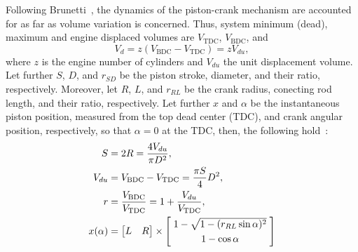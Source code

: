    Following Brunetti~\cite{2012-BrunettiF-Blucher}, the dynamics of the piston-crank mechanism are accounted  for  as  far  as
    volume variation is concerned. Thus, system minimum (dead), maximum and engine displaced volumes are  $V_{\mathrm{TDC}}$,  $V_{\mathrm{BDC}}$,
    and%
    \begin{equation}
        V_d = z(V_{\mathrm{BDC}} - V_{\mathrm{TDC}}) = zV_{du},
        \label{eq:Vd}
    \end{equation}
    \noindent where $z$ is the engine number of cylinders and $V_{du}$ the unit displacement volume. Let further $S$,  $D$,  and
    $r_{SD}$ be the piston stroke, diameter, and their ratio, respectively. Moreover, let $R$, $L$, and $r_{RL}$  be  the  crank
    radius, conecting rod length, and their ratio, respectively. Let further  $x$  and  $\alpha$  be  the  instantaneous  piston
    position, measured from the top dead center (TDC), and crank angular position, respectively, so that $\alpha  =  0$  at  the
    TDC, then, the following hold~\cite{2012-BrunettiF-Blucher, 2017-NaaktgeborenC-IntJMechEngEduc}:%
    \begin{align}
        \label{eq:S}
        S           &= 2R = \frac{4 V_{du}}{\pi D^{2}}, \\
        \label{eq:Vdu}
        V_{du}      &= V_{\mathrm{BDC}} - V_{\mathrm{TDC}} = \frac{\pi S}{4} D^{2}, \\
        \label{eq:r}
        r           &= \frac{V_{\mathrm{BDC}}}{V_{\mathrm{TDC}}} = 1 + \frac{V_{du}}{V_{\mathrm{TDC}}}, \\
        \label{eq:x}
        x(\alpha)   &= \left[
                \begin{matrix}
                    \textstyle L &
                    \textstyle R
                \end{matrix}
            \right]\times\left[
                \begin{matrix}
                    \textstyle \;1 - \sqrt{1 - (r_{RL}\sin\alpha)^2}\; \\[\smallskipamount]
                    \textstyle 1 - \cos\alpha
                \end{matrix}
            \right]
    \end{align}


